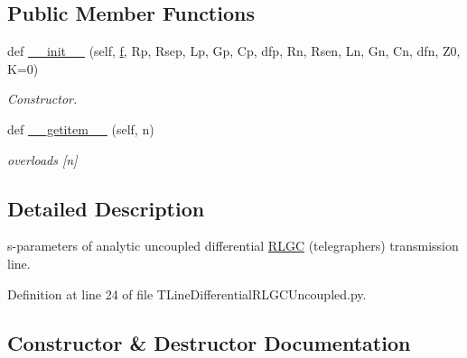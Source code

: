 \subsection*{Public Member Functions}
\begin{DoxyCompactItemize}
\item 
def \hyperlink{classSignalIntegrity_1_1SParameters_1_1Devices_1_1TLineDifferentialRLGCUncoupled_1_1TLineDifferentialRLGCUncoupled_aa6650052dc2b466ac52639326346b20a}{\+\_\+\+\_\+init\+\_\+\+\_\+} (self, \hyperlink{classSignalIntegrity_1_1SParameters_1_1SParameters_1_1SParameters_a32e7a34d6837fe949b413c852a0447f8}{f}, Rp, Rsep, Lp, Gp, Cp, dfp, Rn, Rsen, Ln, Gn, Cn, dfn, Z0, K=0)
\begin{DoxyCompactList}\small\item\em Constructor. \end{DoxyCompactList}\item 
def \hyperlink{classSignalIntegrity_1_1SParameters_1_1Devices_1_1TLineDifferentialRLGCUncoupled_1_1TLineDifferentialRLGCUncoupled_ab7a6da5139e0878b590d68292aaa70f2}{\+\_\+\+\_\+getitem\+\_\+\+\_\+} (self, n)
\begin{DoxyCompactList}\small\item\em overloads \mbox{[}n\mbox{]} \end{DoxyCompactList}\end{DoxyCompactItemize}


\subsection{Detailed Description}
s-\/parameters of analytic uncoupled differential \hyperlink{namespaceSignalIntegrity_1_1SParameters_1_1RLGC}{R\+L\+GC} (telegrapher\textquotesingle{}s) transmission line. 



Definition at line 24 of file T\+Line\+Differential\+R\+L\+G\+C\+Uncoupled.\+py.



\subsection{Constructor \& Destructor Documentation}
\mbox{\label{classSignalIntegrity_1_1SParameters_1_1Devices_1_1TLineDifferentialRLGCUncoupled_1_1TLineDifferentialRLGCUncoupled_aa6650052dc2b466ac52639326346b20a}} 
